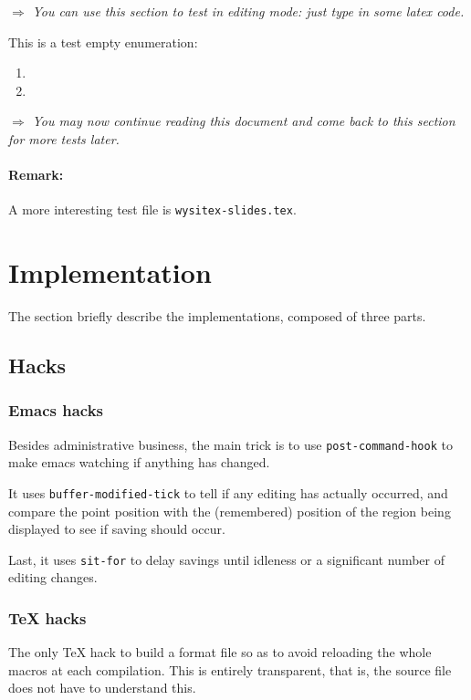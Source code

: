 \documentclass{article}
\let \lst \verb
\def \instruction #1{\par\medskip \noindent$\Rightarrow$ {\em #1}}
\begin{document}
\instruction
{You can use this section to test in editing mode: just type in some 
latex code.}

This is a test empty enumeration: 
\begin {enumerate}

\item

\item

\end {enumerate}

\instruction
{You may now continue reading this document and come back to this
section for more tests later.}

\paragraph{Remark:}
A more interesting test file is \lst"wysitex-slides.tex". 


\section {Implementation}%

The section briefly describe the implementations, composed of three parts. 

\subsection {Hacks}%

\subsubsection* {Emacs hacks}

Besides administrative business, the main trick is to use 
\lst"post-command-hook" to make emacs watching if anything has changed. 

It uses \lst"buffer-modified-tick" to tell if any editing has actually
occurred, and compare the point position with the (remembered) position of
the region being displayed to see if saving should occur. 

Last, it uses \lst"sit-for" to delay savings until idleness or a
significant number of editing changes. 

\subsubsection* {TeX hacks}

The only TeX hack to build a format file so as to avoid reloading the whole
macros at each compilation. This is entirely transparent, that is, the
source file does not have to understand this.
\end{document}
